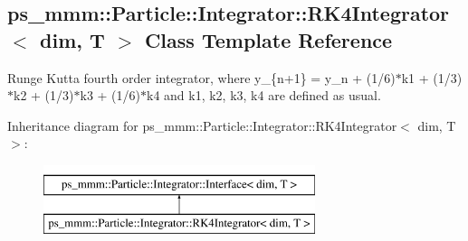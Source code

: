 \hypertarget{classps__mmm_1_1_particle_1_1_integrator_1_1_r_k4_integrator}{}\subsection{ps\+\_\+mmm\+:\+:Particle\+:\+:Integrator\+:\+:R\+K4\+Integrator$<$ dim, T $>$ Class Template Reference}
\label{classps__mmm_1_1_particle_1_1_integrator_1_1_r_k4_integrator}


Runge Kutta fourth order integrator, where y\+\_\+\{n+1\} = y\+\_\+n + (1/6)$\ast$k1 + (1/3)$\ast$k2 + (1/3)$\ast$k3 + (1/6)$\ast$k4 and k1, k2, k3, k4 are defined as usual.  


Inheritance diagram for ps\+\_\+mmm\+:\+:Particle\+:\+:Integrator\+:\+:R\+K4\+Integrator$<$ dim, T $>$\+:\begin{figure}[H]
\begin{center}
\leavevmode
\includegraphics[height=2.000000cm]{classps__mmm_1_1_particle_1_1_integrator_1_1_r_k4_integrator}
\end{center}
\end{figure}
